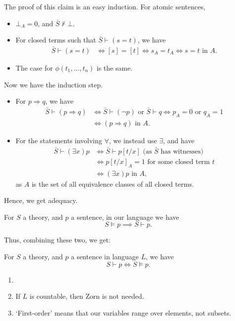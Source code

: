 \documentclass[12pt]{article}
\begin{document}
\begin{proofbox}
	The proof of this claim is an easy induction. For atomic sentences,
	\begin{itemize}
		\item $\bot_A = 0$, and $\bar S \not \vdash \bot$.
		\item For closed terms such that $\bar S \vdash (s = t)$, we have
			\begin{align*}
				\bar S \vdash (s = t) & \iff [s] = [t]  \iff s_A = t_A \iff s=t \text{ in } A.
			\end{align*}
		\item The case for $\phi(t_1, \ldots, t_n)$ is the same.
	\end{itemize}
	Now we have the induction step.
	\begin{itemize}
		\item For $p \Rightarrow q$, we have
			\begin{align*}
				\bar S \vdash (p \Rightarrow q) &\iff \bar S \vdash (\neg p) \text{ or } \bar S \vdash q \iff p_A = 0 \text{ or } q_A = 1 \\
								&\iff (p \Rightarrow q) \text{ in } A.
			\end{align*}
		\item For the statements involving $\forall$, we instead use $\exists$, and have
			\begin{align*}
				\bar S \vdash (\exists x)p & \iff \bar S \vdash p[t/x] \text{ (as $\bar S$ has witnesses)} \\
							   &\iff p[t/x]_{A} = 1 \text{ for some closed term $t$} \\
							   &\iff (\exists x)p \text{ in } A,
			\end{align*}
			as $A$ is the set of all equivalence classes of all closed terms.
	\end{itemize}
\end{proofbox}

Hence, we get adequacy.
\begin{corollary}[Adequacy]
	For $S$ a theory, and $p$ a sentence, in our language we have
	\[
	S \models p \implies S \vdash p.
	\]
\end{corollary}

Thus, combining these two, we get:
\begin{theorem}
	For $S$ a theory, and $p$ a sentence in language $L$, we have
	\[
	S \vdash p \iff S \models p.
	\]
\end{theorem}
\begin{remark}
	\begin{enumerate}
		\item[]
		\item If $L$ is countable, then Zorn is not needed.
		\item `First-order' means that our variables range over elements, not subsets.
	\end{enumerate}
\end{remark}
\end{document}
